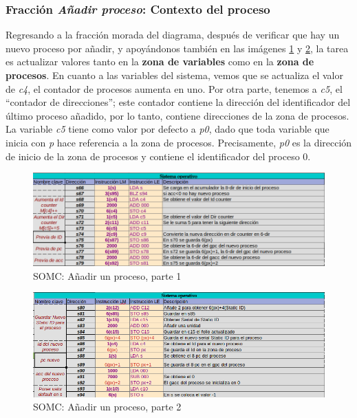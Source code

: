 \documentclass[letterpaper,12pt,oneside]{book}
\begin{document}
            \subsubsection{Fracción \textit{Añadir proceso}: Contexto del proceso}
			
			Regresando a la fracción morada del diagrama, después de verificar que hay un nuevo proceso por añadir, y apoyándonos
			también en las imágenes \ref{fig:somcAddnewprocess} y \ref{fig:somcAddnewprocess2}, la tarea es actualizar valores tanto en la \textbf{zona 
			de 
			variables}
			como en la \textbf{zona de procesos}. En cuanto a las variables del sistema, vemos que se actualiza el valor de \textit{c4}, el contador
			de procesos aumenta en uno. Por otra parte, tenemos a \textit{c5}, el ``contador de direcciones''; este contador
			contiene la dirección del identificador del último proceso añadido, por lo tanto, contiene direcciones de la zona de procesos.
			La variable \textit{c5} tiene como valor por defecto a \textit{p0}, dado que toda variable que inicia con \textit{p} hace referencia a la 
			zona de 
			procesos.
			Precisamente, \textit{p0} es la dirección de inicio de la zona de procesos y contiene el identificador del proceso 0. 


		\begin{figure}[h]		
			\centering
			\includegraphics[scale=0.55]{media/CARDIACC/SO_AddNewProcess.png}
			\caption{SOMC: Añadir un proceso, parte 1}
			\label{fig:somcAddnewprocess}
		\end{figure}
		
				\begin{figure}[h]		
			\centering
			\includegraphics[scale=0.55]{media/CARDIACC/SO_AddNewProcess2.png}
			\caption{SOMC: Añadir un proceso, parte 2}
			\label{fig:somcAddnewprocess2}
		\end{figure}
			
\end{document}
